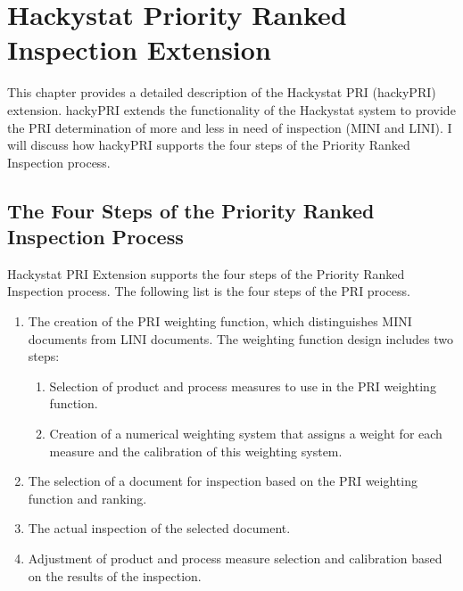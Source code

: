 
\chapter{Hackystat Priority Ranked Inspection Extension}
\label{chapter:system}
This chapter provides a detailed description of the Hackystat PRI
(hackyPRI) extension. hackyPRI extends the functionality of the Hackystat
system to provide the PRI determination of more and less in need of
inspection (MINI and LINI). I will discuss how hackyPRI supports the four
steps of the Priority Ranked Inspection process.


\section{The Four Steps of the Priority Ranked Inspection Process}
Hackystat PRI Extension supports the four steps of the Priority Ranked
Inspection process. The following list is the four steps of the PRI
process.

\begin{enumerate}
\item The creation of the PRI weighting function, which distinguishes MINI
  documents from LINI documents. The weighting function design includes two 
  steps: 
\begin{enumerate}
\item Selection of product and process measures to use in the PRI
  weighting function.
\item Creation of a numerical weighting system that assigns a weight for
  each measure and the calibration of this weighting system.
\end{enumerate}
\item The selection of a document for inspection based on the PRI
  weighting function and ranking.
\item The actual inspection of the selected document.
\item Adjustment of product and process measure selection and
  calibration based on the results of the inspection.
\end{enumerate}


